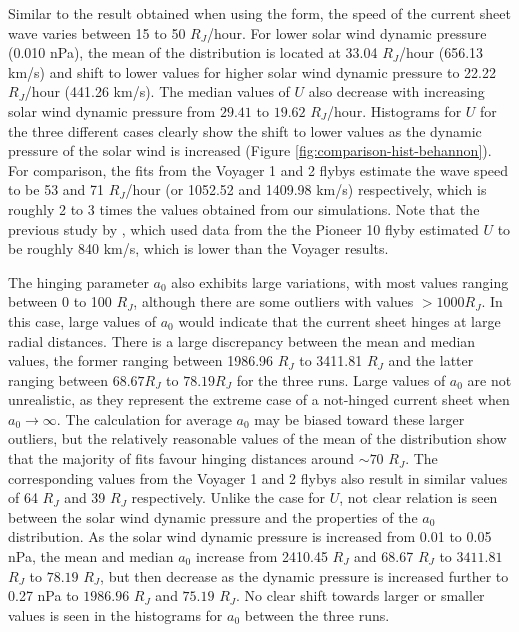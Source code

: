 Similar to the result obtained when using the  form, the speed of the current sheet wave varies between 15 to 50 $R_J$/hour. For lower solar wind dynamic pressure (0.010 nPa), the mean of the distribution is located at 33.04 $R_J$/hour (656.13 km/s) and shift to lower values for higher solar wind dynamic pressure to 22.22 $R_J$/hour (441.26 km/s). The median values of $U$ also decrease with increasing solar wind dynamic pressure from $29.41$ to $19.62$ $R_J$/hour. Histograms for $U$ for the three different cases clearly show the shift to lower values as the dynamic pressure of the solar wind is increased (Figure \ref{fig:comparison-hist-behannon}). For comparison, the fits from the Voyager 1 and 2 flybys estimate the wave speed to be 53 and 71 $R_J$/hour (or 1052.52 and 1409.98 km/s) respectively, which is roughly 2 to 3 times the values obtained from our simulations. Note that the previous study by , which used data from the the Pioneer 10 flyby estimated $U$ to be roughly 840 km/s, which is lower than the Voyager results. 

The hinging parameter $a_0$ also exhibits large variations, with most values ranging between 0 to 100 $R_J$, although there are some outliers with values $>1000 R_J$. In this case, large values of $a_0$ would indicate that the current sheet hinges at large radial distances. There is a large discrepancy between the mean and median values, the former ranging between 1986.96 $R_J$ to 3411.81 $R_J$ and the latter ranging between $68.67 R_J$ to $78.19 R_J$ for the three runs. Large values of $a_0$ are not unrealistic, as they represent the extreme case of a not-hinged current sheet when $a_0\rightarrow\infty$.  The calculation for average $a_0$ may be biased toward these larger outliers, but the relatively reasonable values of the mean of the distribution show that the majority of fits favour hinging distances around $\sim70$ $R_J$. The corresponding values from the Voyager 1 and 2 flybys also result in similar values of 64 $R_J$ and 39 $R_J$ respectively. Unlike the case for $U$, not clear relation is seen between the solar wind dynamic pressure and the properties of the $a_0$ distribution. As the solar wind dynamic pressure is increased from 0.01 to 0.05 nPa, the mean and median $a_0$ increase from 2410.45 $R_J$ and 68.67 $R_J$ to $3411.81$ $R_J$ to $78.19$ $R_J$, but then decrease as the dynamic pressure is increased further to 0.27 nPa to $1986.96$ $R_J$ and $75.19$ $R_J$. No clear shift towards larger or smaller values  is seen in the histograms for $a_0$ between the three runs.
 
